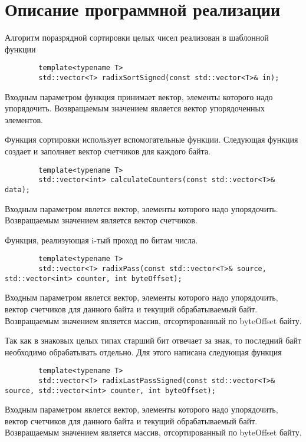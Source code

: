 \documentclass{report}
\begin{document}
	\section*{Описание программной реализации}
	Алгоритм поразрядной сортировки целых чисел реализован в шаблонной функции
	\begin{lstlisting}
		template<typename T>
        std::vector<T> radixSortSigned(const std::vector<T>& in);
	\end{lstlisting}
	\par Входным параметром функция принимает вектор, элементы которого надо упорядочить. Возвращаемым значением является вектор упорядоченных элементов.
	\par Функция сортировки использует вспомогательные функции. Следующая функция создает и заполняет вектор счетчиков для каждого байта. 
	\begin{lstlisting}
		template<typename T>
        std::vector<int> calculateCounters(const std::vector<T>& data);
	\end{lstlisting}
	\par Входным параметром явлется вектор, элементы которого надо упорядочить. Возвращаемым значением является вектор счетчиков.
	\par Функция, реализующая i-тый проход по битам числа.
	\begin{lstlisting}
		template<typename T>
        std::vector<T> radixPass(const std::vector<T>& source, std::vector<int> counter, int byteOffset);
	\end{lstlisting}
	\par Входным параметром явлется вектор, элементы которого надо упорядочить, вектор счетчиков для данного байта и текущий обрабатываемый байт. Возвращаемым значением является массив, отсортированный по byteOffset байту.
	\par Так как в знаковых целых типах старший бит отвечает за знак, то последний байт необходимо обрабатывать отдельно. Для этого написана следующая функция
	\begin{lstlisting}
        template<typename T>
        std::vector<T> radixLastPassSigned(const std::vector<T>& source, std::vector<int> counter, int byteOffset);
	\end{lstlisting}
	\par Входным параметром явлется вектор, элементы которого надо упорядочить, вектор счетчиков для данного байта и текущий обрабатываемый байт. Возвращаемым значением является массив, отсортированный по byteOffset байту.
\end{document}
